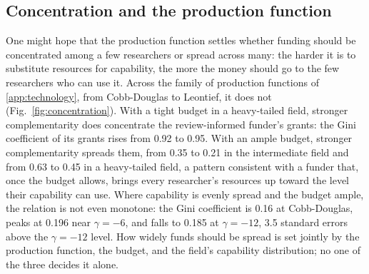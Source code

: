\subsection*{Concentration and the production function}
One might hope that the production function settles whether funding should be concentrated among a few researchers or spread across many: the harder it is to substitute resources for capability, the more the money should go to the few researchers who can use it. Across the family of production functions of \ref{app:technology}, from Cobb-Douglas to Leontief, it does not (Fig.~\ref{fig:concentration}). With a tight budget in a heavy-tailed field, stronger complementarity does concentrate the review-informed funder's grants: the Gini coefficient of its grants rises from 0.92 to 0.95. With an ample budget, stronger complementarity spreads them, from 0.35 to 0.21 in the intermediate field and from 0.63 to 0.45 in a heavy-tailed field, a pattern consistent with a funder that, once the budget allows, brings every researcher's resources up toward the level their capability can use. Where capability is evenly spread and the budget ample, the relation is not even monotone: the Gini coefficient is 0.16 at Cobb-Douglas, peaks at 0.196 near $\gamma = -6$, and falls to 0.185 at $\gamma = -12$, 3.5 standard errors above the $\gamma = -12$ level. How widely funds should be spread is set jointly by the production function, the budget, and the field's capability distribution; no one of the three decides it alone.


